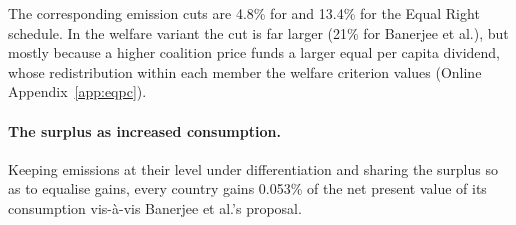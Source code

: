 \documentclass[12pt,english]{article}
\theoremstyle{remark}
\begin{document}
The corresponding emission cuts are 4.8\% for \citet{wolfram_building_2025} and 13.4\% for the Equal Right schedule. In the welfare variant the cut is far larger (21\% for Banerjee et al.), but mostly because a higher coalition price funds a larger equal per capita dividend, whose redistribution within each member the welfare criterion values (Online Appendix~\ref{app:eqpc}). %


\paragraph{The surplus as increased consumption.} Keeping emissions at their level under differentiation and sharing the surplus so as to equalise gains, every country gains 0.053\% of the net present value of its consumption vis-à-vis Banerjee et al.'s proposal. %
\end{document}
